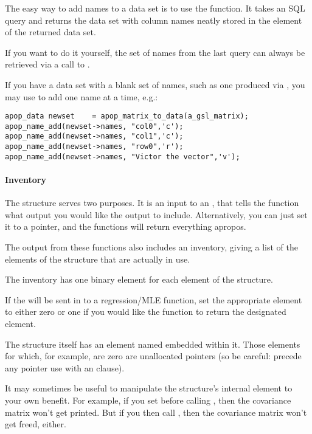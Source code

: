 The easy way to add names to a data set is to use the 
 function. It takes an SQL query and returns
the data set with column names neatly stored in
the  element of the returned data set.

If you want to do it yourself, the set of names from the last query can
always be retrieved via a call to .

If you have a data set with a blank set of names, such as one
produced via ,
you may use  to add one name at a
time, e.g.:
 \begin{lstlisting}
apop_data newset    = apop_matrix_to_data(a_gsl_matrix);
apop_name_add(newset->names, "col0",'c');
apop_name_add(newset->names, "col1",'c');
apop_name_add(newset->names, "row0",'r');
apop_name_add(newset->names, "Victor the vector",'v');
\end{lstlisting}

\paragraph{Inventory}
The  structure serves two purposes. It is an input
to an , that tells the function what output you
would like the  output to include.  Alternatively, you
can just set it to a  pointer, and the functions will return
everything apropos.

The output from these functions also includes an inventory, 
giving a list of the elements of the structure that are
actually in use. 

The inventory has one binary element for each element of the  structure.

If the  will be sent in to a regression/MLE
function, set the appropriate element to either zero or one if you would
like the function to return the designated  element.

The  structure itself has an 
element named  embedded within it. Those elements for
which, for example,  are zero are unallocated pointers (so be careful:
precede any pointer use with an  clause).

It may sometimes be useful to manipulate the  structure's
internal  element to your own benefit. For
example, if you set  before calling
, then the covariance matrix won't get
printed. But if you then call ,
then the covariance matrix won't get freed, either.

